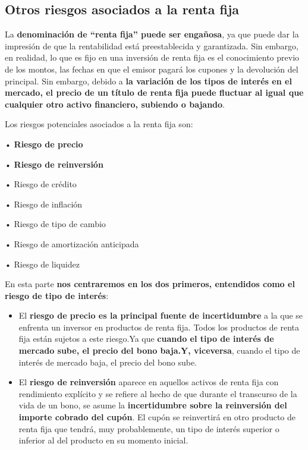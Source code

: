 \documentclass[
  letterpaper,
  DIV=11,
  numbers=noendperiod]{scrartcl}
\begin{document}
\hypertarget{otros-riesgos-asociados-a-la-renta-fija}{%
\subsection{Otros riesgos asociados a la renta
fija}\label{otros-riesgos-asociados-a-la-renta-fija}}

La \textbf{denominación de ``renta fija'' puede ser engañosa}, ya que
puede dar la impresión de que la rentabilidad está preestablecida y
garantizada. Sin embargo, en realidad, lo que es fijo en una inversión
de renta fija es el conocimiento previo de los montos, las fechas en que
el emisor pagará los cupones y la devolución del principal. Sin embargo,
debido a \textbf{la variación de los tipos de interés en el mercado, el
precio de un título de renta fija puede fluctuar al igual que cualquier
otro activo financiero, subiendo o bajando}.

Los riesgos potenciales asociados a la renta fija son:

• \textbf{Riesgo de precio}

• \textbf{Riesgo de reinversión}

• Riesgo de crédito

• Riesgo de inflación

• Riesgo de tipo de cambio

• Riesgo de amortización anticipada

• Riesgo de liquidez

En esta parte \textbf{nos centraremos en los dos primeros, entendidos
como el riesgo de tipo de interés}:

\begin{itemize}
\item
  El \textbf{riesgo de precio es la principal fuente de incertidumbre} a
  la que se enfrenta un inversor en productos de renta fija. Todos los
  productos de renta fija están sujetos a este riesgo.Ya que
  \textbf{cuando el tipo de interés de mercado sube, el precio del bono
  baja.Y, viceversa}, cuando el tipo de interés de mercado baja, el
  precio del bono sube.
\item
  El \textbf{riesgo de reinversión} aparece en aquellos activos de renta
  fija con rendimiento explícito y se refiere al hecho de que durante el
  transcurso de la vida de un bono, se asume la \textbf{incertidumbre
  sobre la reinversión del importe cobrado del cupón}. El cupón se
  reinvertirá en otro producto de renta fija que tendrá, muy
  probablemente, un tipo de interés superior o inferior al del producto
  en su momento inicial.
\end{itemize}
\end{document}
